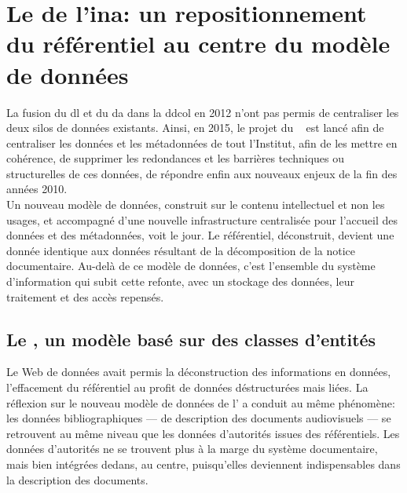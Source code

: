 \section{\label{III-B-2}Le \ldd de l'\ac{ina}: un repositionnement du référentiel au centre du modèle de données}

La fusion du \ac{dl} et du \ac{da} dans la \ac{ddcol} en 2012 n'ont pas permis de centraliser les deux silos de données existants. Ainsi, en 2015, le projet du \ldd~ est lancé afin de centraliser les données et les métadonnées de tout l'Institut, afin de les mettre en cohérence, de supprimer les redondances et les barrières techniques ou structurelles de ces données, de répondre enfin aux nouveaux enjeux de la fin des années 2010.\\

Un nouveau modèle de données, construit sur le contenu intellectuel et non les usages, et accompagné d'une nouvelle infrastructure centralisée pour l'accueil des données et des métadonnées, voit le jour. Le référentiel, déconstruit, devient une donnée identique aux données résultant de la décomposition de la notice documentaire. Au-delà de ce modèle de données, c'est l'ensemble du système d'information qui subit cette refonte, avec un stockage des données, leur traitement et des accès repensés.

\subsection{\label{III-B-2-a}Le \ldd, un modèle basé sur des classes d'entités}

Le Web de données avait permis la déconstruction des informations en données, l'effacement du référentiel au profit de données déstructurées mais liées. La réflexion sur le nouveau modèle de données de l' a conduit au même phénomène: les données bibliographiques --- de description des documents audiovisuels --- se retrouvent au même niveau que les données d'autorités issues des référentiels. Les données d'autorités ne se trouvent plus à la marge du système documentaire, mais bien intégrées dedans, au centre, puisqu'elles deviennent indispensables dans la description des documents.\\

